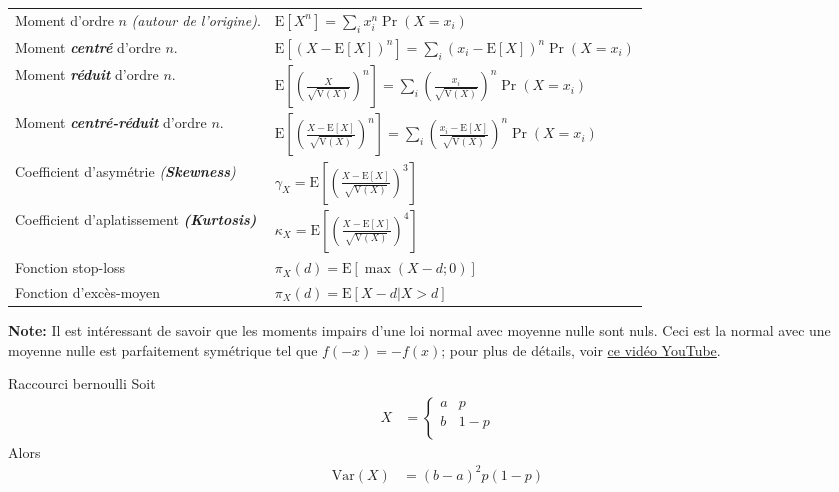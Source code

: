 \documentclass[10pt, french]{article}
\begin{document}
\begin{multicols*}{2}
\begin{tabular}{| l | l |}
\hline
	Moment d'ordre $n$ \textit{(autour de l'origine)}.	&	$\text{E}[X^{n}] = \underset{i}{\sum} x_{i}^{n} \Pr(X = x_{i})$	\\
	Moment \textbf{\textit{centré}} d'ordre $n$.	&	$\text{E}[(X - \text{E}[X])^{n}] = \underset{i}{\sum} (x_{i} - \text{E}[X])^{n} \Pr(X = x_{i})$	\\
	Moment \textbf{\textit{réduit}} d'ordre $n$.&	$\text{E}\left[\left(\frac{X}{\sqrt{\text{V}(X)}}\right)^{n}\right] = \underset{i}{\sum} \left(\frac{x_{i}}{\sqrt{\text{V}(X)}}\right)^{n} \Pr(X = x_{i})$	\\
	Moment \textbf{\textit{centré-réduit}} d'ordre $n$.	&	$\text{E}\left[\left(\frac{X - \text{E}[X]}{\sqrt{\text{V}(X)}}\right)^{n}\right] = \underset{i}{\sum} \left(\frac{x_{i} - \text{E}[X]}{\sqrt{\text{V}(X)}}\right)^{n} \Pr(X = x_{i})$	\\
	Coefficient d'asymétrie \textit{(\textbf{Skewness})} 	&	$\gamma_{X} = \text{E}\left[\left(\frac{X - \text{E}[X]}{\sqrt{\text{V}(X)}}\right)^{3}\right]$	\\
	Coefficient d'aplatissement \textit{\textbf{(Kurtosis)}} 	&	$\kappa_{X} = \text{E}\left[\left(\frac{X - \text{E}[X]}{\sqrt{\text{V}(X)}}\right)^{4}\right]$	\\
	Fonction stop-loss 	&	$\pi_{X}(d) = \text{E}\left[\max(X - d; 0)\right]$	\\
	Fonction d'excès-moyen 	&	$\pi_{X}(d) = \text{E}\left[X - d | X > d\right]$	\\	\hline
\end{tabular}

\textbf{Note: } Il est intéressant de savoir que les moments impairs d'une loi normal avec moyenne nulle sont nuls.
Ceci est la normal avec une moyenne nulle est parfaitement symétrique tel que $f(-x) = -f(x)$; pour plus de détails, voir \href{https://www.youtube.com/watch?v=V4CjFT0k-_E}{ce vidéo YouTube}.

\begin{rappel}{Raccourci bernoulli}
Soit 
\begin{align*}
	X
	&=	\begin{cases}
		a	&	p	\\
		b	&	1 - p	\\
		\end{cases}
\end{align*}
Alors
\begin{align*}
	\text{Var}(X)	
	&=	(b - a)^{2}p (1 - p)
\end{align*}
\end{rappel}


\end{multicols*}
\end{document}
